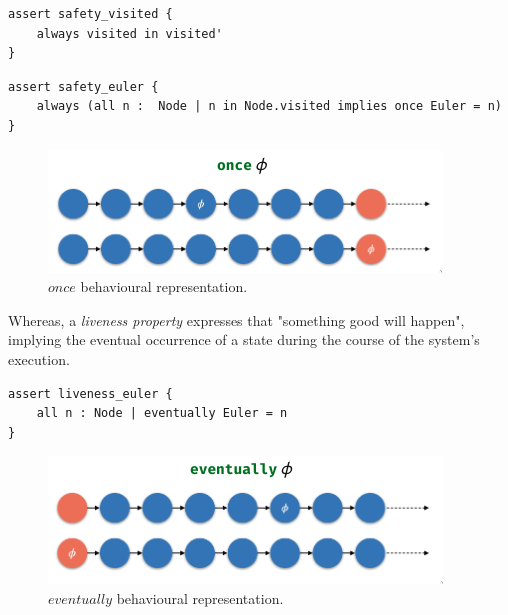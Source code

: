 \begin{lstlisting}[title={\textit{Safety Property}: The relation visited can only evolve through time.}, otherkeywords = {always, assert, module, set, fact, iden, no, in, \=, \*, \+, \~, \-\>, \&, '}, floatplacement=H]
assert safety_visited {
    always visited in visited'
} 
\end{lstlisting}

\begin{lstlisting}[title={\textit{Safety Property}: If a node is visited, then once \textit{Euler} was 'inside' it.}, otherkeywords = {always, assert, module, set, fact, iden, no, in, \=, \*, \+, \~, \-\>, \&, all, \:, \., implies, once}, floatplacement=H]
assert safety_euler {
    always (all n :  Node | n in Node.visited implies once Euler = n)
} 
\end{lstlisting}

\begin{figure}[H]
    \centering
    \includegraphics[width=0.6\linewidth]{images/alloy_once.png}
    \caption{$once$ behavioural representation.}
    \label{fig:alloy-once}
\end{figure}

Whereas, a \textit{liveness property} expresses that "something good will happen", implying the eventual occurrence of a state during the course of the system's execution. \cite{lamport1977proving}

\begin{lstlisting}[title={\textit{Liveness Property}: Eventually every node will be visited.}, otherkeywords = {eventually, always, assert, all, \:, module, set, fact, iden, no, in, \=, \*, \+, \~, \-\>, \&}, floatplacement=H, label={liveness}]
assert liveness_euler {
    all n : Node | eventually Euler = n
} 
\end{lstlisting}

\begin{figure}[H]
    \centering
    \includegraphics[width=0.6\linewidth]{images/alloy_eventually.png}
    \caption{$eventually$ behavioural representation.}
    \label{fig:alloy-eventually}
\end{figure}

